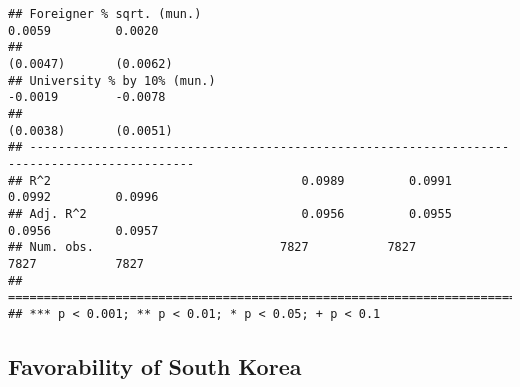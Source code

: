 \documentclass[
]{article}
\begin{document}
\begin{verbatim}
## Foreigner % sqrt. (mun.)                                            0.0059         0.0020    
##                                                                    (0.0047)       (0.0062)   
## University % by 10% (mun.)                                         -0.0019        -0.0078    
##                                                                    (0.0038)       (0.0051)   
## ---------------------------------------------------------------------------------------------
## R^2                                   0.0989         0.0991         0.0992         0.0996    
## Adj. R^2                              0.0956         0.0955         0.0956         0.0957    
## Num. obs.                          7827           7827           7827           7827         
## =============================================================================================
## *** p < 0.001; ** p < 0.01; * p < 0.05; + p < 0.1
\end{verbatim}

\hypertarget{favorability-of-south-korea}{%
\subsection{Favorability of South
Korea}\label{favorability-of-south-korea}}
\end{document}
